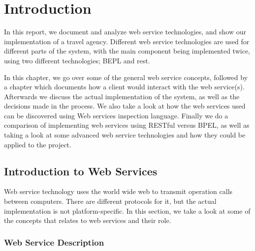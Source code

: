 \chapter{Introduction}
\mrb

\noindent
In this report, we document and analyze web service technologies, and show our implementation of a travel agency. Different web service technologies are used for different parts of the system, with the main component being implemented twice, using two different technologies; BEPL and rest.

In this chapter, we go over some of the general web service concepts, followed by a chapter which documents how a client would interact with the web service(s). Afterwards we discuss the actual implementation of the system, as well as the decisions made in the process. We also take a look at how the web services used can be discovered using Web services inspection language. Finally we do a comparison of implementing web services using RESTful versus BPEL, as well as taking a look at some advanced web service technologies and how they could be applied to the project.


\section{Introduction to Web Services}
\mrb

\noindent
Web service technology uses the world wide web to transmit operation calls between computers. There are different protocols for it, but the actual implementation is not platform-specific. In this section, we take a look at some of the concepts that relates to web services and their role. 


\subsection{Web Service Description}
\mkt

